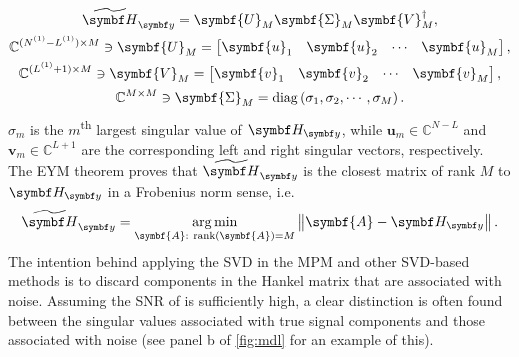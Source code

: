 \begin{subequations}
    \begin{gather}
    \Hytilde =
        \symbf{U}_M^{\vphantom{\dagger}}
        \symbf{\Sigma}_M^{\vphantom{\dagger}}
        \symbf{V}_M^{\dagger},\\
    \mathbb{C}^{(\None - \Lone) \times M} \ni
        \symbf{U}_M^{\vphantom{\dagger}} =
        \begin{bmatrix}
            \symbf{u}_1 &
            \symbf{u}_2 &
            \cdots &
            \symbf{u}_M
        \end{bmatrix},\\
    \mathbb{C}^{(\Lone + 1) \times M} \ni
        \symbf{V}_M^{\vphantom{\dagger}} =
        \begin{bmatrix}
            \symbf{v}_1 &
            \symbf{v}_2 &
            \cdots &
            \symbf{v}_M
        \end{bmatrix},\\
    \mathbb{C}^{M \times M} \ni
        \symbf{\Sigma}_M^{\vphantom{\dagger}} =
        \diag \left( \sigma_1, \sigma_2, \cdots, \sigma_M \right).
    \end{gather}
\end{subequations}
$\sigma_m$ is the $m$\textsuperscript{th} largest singular value of $\Hy$,
while $\symbf{u}_m \in \mathbb{C}^{N - L}$ and $\symbf{v}_m \in
\mathbb{C}^{L+1}$ are the corresponding left and right singular vectors,
respectively. The \ac{EYM} theorem proves that $\Hytilde$ is the closest matrix
of rank $M$ to $\Hy$ in a Frobenius norm sense, i.e.
\begin{equation}
    \Hytilde = \argmin_{\symbf{A}:\ \rank(\symbf{A}) = M} \left \lVert \symbf{A} - \Hy \right \rVert.
\end{equation}
The intention behind applying the \ac{SVD} in the \ac{MPM} and other
\ac{SVD}-based methods is to discard components in the Hankel matrix that are
associated with noise. Assuming the \ac{SNR} of  is sufficiently high,
a clear distinction is often found between the singular values associated with
true signal components and those associated with noise (see panel b of
\cref{fig:mdl} for an example of this).

